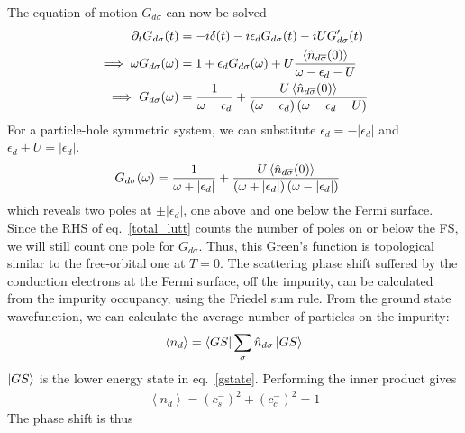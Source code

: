 \documentclass[12pt,twoside]{article}
\numberwithin{equation}{section}
\begin{document}
The equation of motion \(G_{d\sigma}\) can now be solved
\begin{equation}\begin{aligned}
	\partial_t G_{d\sigma}(t) &= -i \delta(t) - i\epsilon_d G_{d\sigma}(t) - iU G^\prime_{d\sigma}(t)\\
	\implies \omega G_{d\sigma}(\omega) &= 1 + \epsilon_d G_{d\sigma}(\omega) + U\frac{\left< \hat n_{d\overline\sigma}(0)\right>}{\omega - \epsilon_d - U}\\
	\implies G_{d\sigma}(\omega) &= \frac{1}{\omega - \epsilon_d} + \frac{U\left< \hat n_{d\overline\sigma}(0)\right>}{\left( \omega - \epsilon_d \right) \left(\omega - \epsilon_d - U\right)}
\end{aligned}\end{equation}
For a particle-hole symmetric system, we can substitute \(\epsilon_d = -|\epsilon_d|\) and \(\epsilon_d + U = |\epsilon_d|\).
\begin{equation}\begin{aligned}
	G_{d\sigma}(\omega) &= \frac{1}{\omega + |\epsilon_d|} + \frac{U\left< \hat n_{d\overline\sigma}(0)\right>}{\left( \omega + |\epsilon_d| \right) \left(\omega - |\epsilon_d|\right)}
\end{aligned}\end{equation}
which reveals two poles at \(\pm |\epsilon_d|\), one above and one below the Fermi surface. Since the RHS of eq.~\ref{total_lutt} counts the number of poles on or below the FS, we will still count one pole for \(G_{d\sigma}\). Thus, this Green's function is topological similar to the free-orbital one at \(T=0\).
\pb The scattering phase shift suffered by the conduction electrons at the Fermi surface, off the impurity, can be calculated from the impurity occupancy, using the Friedel sum rule. From the ground state wavefunction, we can calculate the average number of particles on the impurity:
\begin{equation}\begin{aligned}
	\left<n_d \right> = \bra{GS}\sum_\sigma \hat n_{d\sigma} \ket{GS}
\end{aligned}\end{equation}
\(\ket{GS}\) is the lower energy state in eq.~\ref{gstate}. Performing the inner product gives
\begin{equation}\begin{aligned}
	\left<n_d \right> = \left( c_s^- \right)^2 + \left( c_c^- \right)^2 = 1
\end{aligned}\end{equation}
The phase shift is thus
\end{document}

